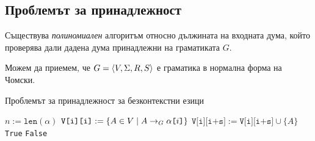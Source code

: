 \subsection{Проблемът за принадлежност}

\begin{theorem}
  Съществува {\em полиномиален} алгоритъм относно дължината на входната дума, който проверява дали дадена дума принадлежни на граматиката $G$.
\end{theorem}
Можем да приемем, че $G = \langle{V,\Sigma,R,S}\rangle$ е граматика в нормална форма на Чомски.
\begin{algorithm}[H]
  \caption{Проблемът за принадлежност за безконтекстни езици}
  \label{alg:belongs-to-grammar}
  \begin{algorithmic}[1]
    \State $n := \texttt{len}(\alpha)$ 
    \State $\texttt{V[i][i]} := \{A \in V \mid A\to_G \alpha\texttt{[}{i}\texttt{]}\}$ \label{alg:cyk:initial}
    \EndFor
    \EndFor
      \label{alg:cyk:first-loop}
    \State $\texttt{V[i][i+s]} := \texttt{V[i][i+s]} \cup \{A\}$ \label{alg:cyk:add-variable}
    \EndIf
    \EndFor
    \EndFor
    \EndFor
    \State \Return \texttt{True}
    \Else
    \State \Return \texttt{False}
    \EndIf
    \EndProcedure
  \end{algorithmic}
\end{algorithm}

